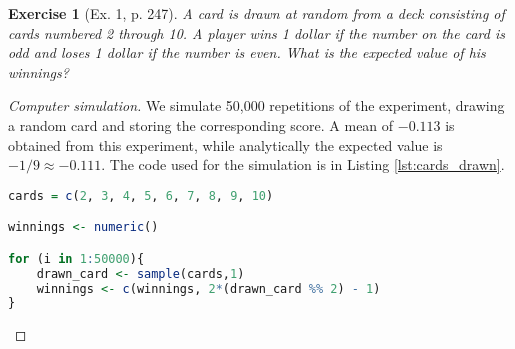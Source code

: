 \documentclass[letterpaper, 10 pt, conference]{article}
\newtheorem{ex}{Exercise}
\begin{document}
\begin{ex}[Ex. 1, p. 247]\label{ex:cards_drawn}
	A card is drawn at random from a deck consisting of cards numbered 2 through 10. A player wins 1 dollar if the number on the card is odd and loses 1 dollar if the number is even. What is the expected value of his winnings?
\end{ex}
\begin{proof}[Computer simulation]
We simulate 50,000 repetitions of the experiment, drawing a random card and storing the corresponding score. A mean of $-0.113$ is obtained from this experiment, while analytically the expected value is $-1/9 \approx -0.111$. The code used for the simulation is in Listing \ref{lst:cards_drawn}.

\begin{lstlisting}[language=R, caption={Code for Exercise \ref{ex:cards_drawn}.}, label={lst:cards_drawn} ]
cards = c(2, 3, 4, 5, 6, 7, 8, 9, 10)

winnings <- numeric()

for (i in 1:50000){
	drawn_card <- sample(cards,1)
	winnings <- c(winnings, 2*(drawn_card %% 2) - 1)
}
\end{lstlisting}
\end{proof}


\end{document}
